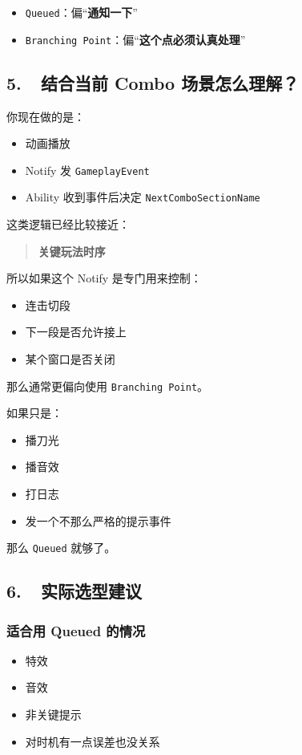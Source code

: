 \begin{itemize}
	\item \texttt{Queued}：偏“\textbf{通知一下}”
	\item \texttt{Branching Point}：偏“\textbf{这个点必须认真处理}”
\end{itemize}

\subsection*{5.\ \ 结合当前 Combo 场景怎么理解？}

你现在做的是：

\begin{itemize}
	\item 动画播放
	\item Notify 发 \texttt{GameplayEvent}
	\item Ability 收到事件后决定 \texttt{NextComboSectionName}
\end{itemize}

这类逻辑已经比较接近：

\begin{quote}
	\textbf{关键玩法时序}
\end{quote}

所以如果这个 Notify 是专门用来控制：

\begin{itemize}
	\item 连击切段
	\item 下一段是否允许接上
	\item 某个窗口是否关闭
\end{itemize}

那么通常更偏向使用 \texttt{Branching Point}。

如果只是：

\begin{itemize}
	\item 播刀光
	\item 播音效
	\item 打日志
	\item 发一个不那么严格的提示事件
\end{itemize}

那么 \texttt{Queued} 就够了。

\subsection*{6.\ \ 实际选型建议}

\subsubsection*{适合用 Queued 的情况}
\begin{itemize}
	\item 特效
	\item 音效
	\item 非关键提示
	\item 对时机有一点误差也没关系
\end{itemize}

